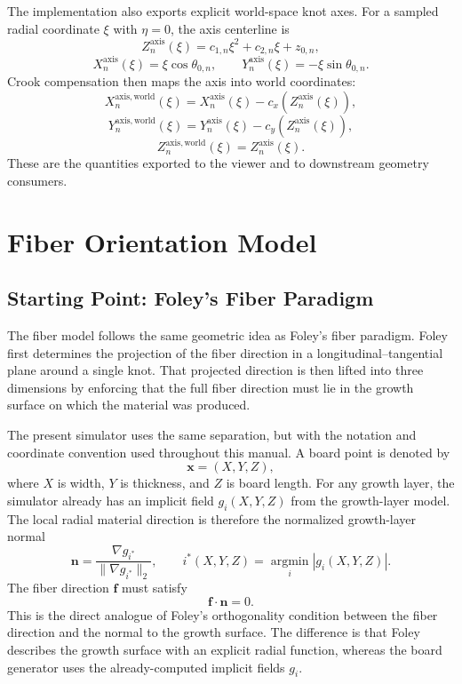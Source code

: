 \documentclass[11pt]{article}
\begin{document}
The implementation also exports explicit world-space knot axes. For a sampled radial coordinate $\xi$ with
$\eta = 0$, the axis centerline is
\begin{equation}
Z^{\mathrm{axis}}_n(\xi) = c_{1,n}\xi^2 + c_{2,n}\xi + z_{0,n},
\end{equation}
\begin{equation}
X^{\mathrm{axis}}_n(\xi) = \xi \cos\theta_{0,n},
\qquad
Y^{\mathrm{axis}}_n(\xi) = -\xi \sin\theta_{0,n}.
\end{equation}
Crook compensation then maps the axis into world coordinates:
\begin{equation}
X^{\mathrm{axis,world}}_n(\xi)
=
X^{\mathrm{axis}}_n(\xi) - c_x\!\left(Z^{\mathrm{axis}}_n(\xi)\right),
\end{equation}
\begin{equation}
Y^{\mathrm{axis,world}}_n(\xi)
=
Y^{\mathrm{axis}}_n(\xi) - c_y\!\left(Z^{\mathrm{axis}}_n(\xi)\right),
\end{equation}
\begin{equation}
Z^{\mathrm{axis,world}}_n(\xi) = Z^{\mathrm{axis}}_n(\xi).
\end{equation}
These are the quantities exported to the viewer and to downstream geometry consumers.

\section{Fiber Orientation Model}

\subsection{Starting Point: Foley's Fiber Paradigm}

The fiber model follows the same geometric idea as Foley's fiber paradigm. Foley first determines the
projection of the fiber direction in a longitudinal--tangential plane around a single knot. That projected
direction is then lifted into three dimensions by enforcing that the full fiber direction must lie in the
growth surface on which the material was produced.

The present simulator uses the same separation, but with the notation and coordinate convention used
throughout this manual. A board point is denoted by
\[
\bm{x}=(X,Y,Z),
\]
where $X$ is width, $Y$ is thickness, and $Z$ is board length. For any growth layer, the simulator already has
an implicit field $g_i(X,Y,Z)$ from the growth-layer model. The local radial material direction is therefore
the normalized growth-layer normal
\begin{equation}
\bm{n}
=
\frac{\nabla g_{i^\ast}}{\|\nabla g_{i^\ast}\|_2},
\qquad
i^\ast(X,Y,Z)=\operatorname*{argmin}_i |g_i(X,Y,Z)|.
\end{equation}
The fiber direction $\bm{f}$ must satisfy
\begin{equation}
\bm{f}\cdot\bm{n}=0.
\end{equation}
This is the direct analogue of Foley's orthogonality condition between the fiber direction and the normal to
the growth surface. The difference is that Foley describes the growth surface with an explicit radial function,
whereas the board generator uses the already-computed implicit fields $g_i$.
\end{document}
